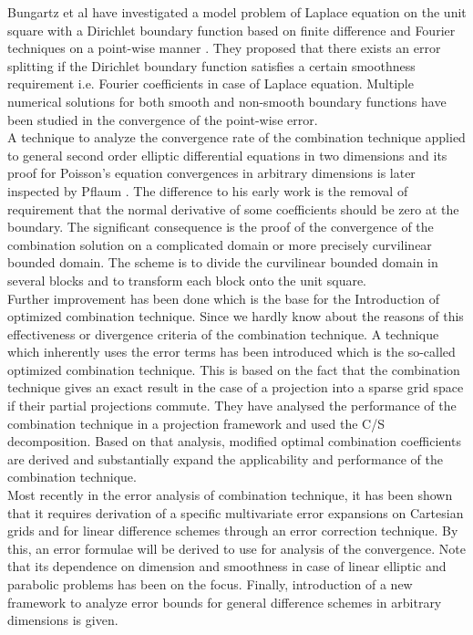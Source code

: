 Bungartz et al have investigated a model problem of Laplace equation on the unit square with a Dirichlet boundary function  based on finite difference and Fourier techniques on a point-wise manner \cite{Bungartz1994}. They proposed that there exists an error splitting if the Dirichlet boundary function satisfies a certain smoothness requirement i.e. Fourier coefficients in case of Laplace equation. Multiple numerical solutions for both smooth and non-smooth boundary functions have been studied in the convergence of the point-wise error.\cite{Bungartz1994}\\

A technique to analyze the convergence rate of the combination technique applied to general second order elliptic differential equations in two dimensions and its proof for Poisson's equation convergences in arbitrary dimensions is later inspected by Pflaum \cite{Pflaum1999}. The difference to his early work is the removal of requirement that the normal derivative of some coefficients should be zero at the boundary. The significant consequence is the proof of the convergence of the combination solution on a complicated domain or more precisely curvilinear bounded domain. The scheme is to divide the curvilinear bounded domain in several blocks and to transform each block onto the unit square. \cite{Pflaum1999}\\

Further improvement has been done which is the base for the Introduction of optimized combination technique. Since we hardly know about the reasons of this effectiveness or divergence criteria of the combination technique. A technique which inherently uses the error terms has been introduced which is the so-called optimized combination technique. This is based on the fact that the combination technique gives an exact result in the case of a projection into a sparse grid space if their partial projections commute. They have analysed the performance of the combination technique in a projection framework and used the C/S decomposition. Based on that analysis, modified optimal combination coefficients are derived and substantially expand the applicability and performance of the combination technique.\cite{Hegland2007}\\

Most recently in the error analysis of combination technique, it has been shown that it requires derivation of a specific multivariate error expansions on Cartesian grids and for linear difference schemes through an error correction technique. By this, an error formulae will be derived to use for analysis of the convergence. Note that its dependence on dimension and smoothness in case of linear elliptic and parabolic problems has been on the focus. Finally, introduction of a new framework to analyze error bounds for general difference schemes in arbitrary dimensions is given. \cite{Reisinger2013}\\ 
